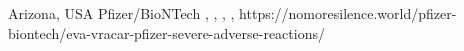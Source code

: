           {
            Arizona, USA
          }
          {
          }
          {
            Pfizer/BioNTech
          }
          {
            ,
          }
          {
            ,
            ,
            ,
          }
          {
            https://nomoresilence.world/pfizer-biontech/eva-vracar-pfizer-severe-adverse-reactions/
          }

